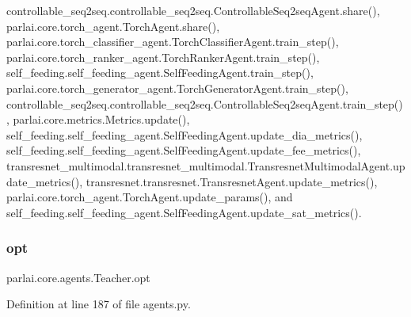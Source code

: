 controllable\+\_\+seq2seq.\+controllable\+\_\+seq2seq.\+Controllable\+Seq2seq\+Agent.\+share(), parlai.\+core.\+torch\+\_\+agent.\+Torch\+Agent.\+share(), parlai.\+core.\+torch\+\_\+classifier\+\_\+agent.\+Torch\+Classifier\+Agent.\+train\+\_\+step(), parlai.\+core.\+torch\+\_\+ranker\+\_\+agent.\+Torch\+Ranker\+Agent.\+train\+\_\+step(), self\+\_\+feeding.\+self\+\_\+feeding\+\_\+agent.\+Self\+Feeding\+Agent.\+train\+\_\+step(), parlai.\+core.\+torch\+\_\+generator\+\_\+agent.\+Torch\+Generator\+Agent.\+train\+\_\+step(), controllable\+\_\+seq2seq.\+controllable\+\_\+seq2seq.\+Controllable\+Seq2seq\+Agent.\+train\+\_\+step(), parlai.\+core.\+metrics.\+Metrics.\+update(), self\+\_\+feeding.\+self\+\_\+feeding\+\_\+agent.\+Self\+Feeding\+Agent.\+update\+\_\+dia\+\_\+metrics(), self\+\_\+feeding.\+self\+\_\+feeding\+\_\+agent.\+Self\+Feeding\+Agent.\+update\+\_\+fee\+\_\+metrics(), transresnet\+\_\+multimodal.\+transresnet\+\_\+multimodal.\+Transresnet\+Multimodal\+Agent.\+update\+\_\+metrics(), transresnet.\+transresnet.\+Transresnet\+Agent.\+update\+\_\+metrics(), parlai.\+core.\+torch\+\_\+agent.\+Torch\+Agent.\+update\+\_\+params(), and self\+\_\+feeding.\+self\+\_\+feeding\+\_\+agent.\+Self\+Feeding\+Agent.\+update\+\_\+sat\+\_\+metrics().

\mbox{\label{classparlai_1_1core_1_1agents_1_1Teacher_a3ce6243860ce978a897922863ed32fa4}} 
\subsubsection{\texorpdfstring{opt}{opt}}
{\footnotesize\ttfamily parlai.\+core.\+agents.\+Teacher.\+opt}



Definition at line 187 of file agents.\+py.



